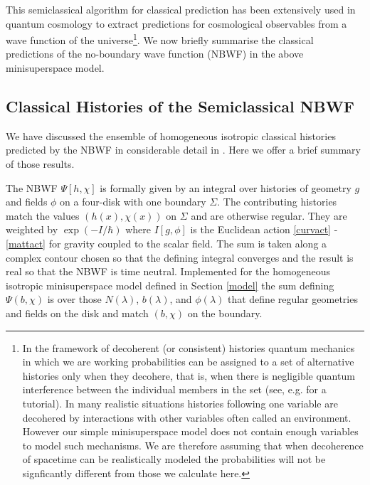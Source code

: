 \documentclass[prd,floats,superscriptaddress,eqsecnum,floatfix,nofootinbib,12pt]{revtex4}
\def\tf{}
\def\uf{}
\begin{document}
This semiclassical algorithm for classical prediction has been extensively used in quantum cosmology to extract predictions for cosmological observables from a wave function of the universe\footnote{In the framework of decoherent (or consistent) histories quantum mechanics in which we are working probabilities can be assigned to a set of alternative histories only when they decohere, that is, when there is negligible quantum interference between the individual members in the set (see, e.g. \cite{Har93a} for a tutorial). In many realistic situations histories following one variable are decohered by interactions with other variables often called an environment. However our simple minisuperspace model does not contain enough variables to model such mechanisms. We are therefore assuming that when decoherence of spacetime can be realistically modeled the probabilities will not be signficantly different from those we calculate here.}. We now briefly summarise the classical predictions of the no-boundary wave function (NBWF) \cite{NBWF} in the above minisuperspace model.

\subsection{Classical Histories {\uf of}  the Semiclassical NBWF}
\label{nbwf-classens}

We have discussed the ensemble of homogeneous isotropic classical histories predicted by the NBWF in considerable detail in \cite{HHH08a,HHH08b}. Here we offer a brief summary of those results. 

The NBWF $\Psi[h,\chi]$ is formally given by an integral over histories of geometry $g$ and fields $\phi$ on a four-{disk} with one boundary $\Sigma$. The contributing histories match the values $(h(x),\chi(x))$ on $\Sigma$ and are otherwise regular. They are weighted by $\exp(-I/\hbar)$ where $I[g,\phi]$ is the Euclidean action \eqref{curvact} - \eqref{mattact} for gravity coupled to the scalar field. The sum is taken along a complex contour chosen so that the defining integral converges and the result is real {\tf so that the NBWF is time neutral}. Implemented for the homogeneous isotropic minisuperspace model defined in Section \ref{model} the sum defining $\Psi(b,\chi)$ is over those $N(\lambda)$, $b(\lambda)$,  and $\phi(\lambda)$ that define regular geometries and fields on the disk and match $(b,\chi)$ on the boundary.  
\end{document}
